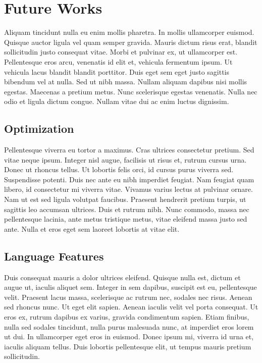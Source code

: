 \chapter{Future Works}
Aliquam tincidunt nulla eu enim mollis pharetra. In mollis ullamcorper euismod. Quisque auctor ligula vel quam semper gravida. Mauris dictum risus erat, blandit sollicitudin justo consequat vitae. Morbi et pulvinar ex, ut ullamcorper est. Pellentesque eros arcu, venenatis id elit et, vehicula fermentum ipsum. Ut vehicula lacus blandit blandit porttitor. Duis eget sem eget justo sagittis bibendum vel at nulla. Sed ut nibh massa. Nullam aliquam dapibus nisi mollis egestas. Maecenas a pretium metus. Nunc scelerisque egestas venenatis. Nulla nec odio et ligula dictum congue. Nullam vitae dui ac enim luctus dignissim.


\section{Optimization}
Pellentesque viverra eu tortor a maximus. Cras ultrices consectetur pretium. Sed vitae neque ipsum. Integer nisl augue, facilisis ut risus et, rutrum cursus urna. Donec ut rhoncus tellus. Ut lobortis felis orci, id cursus purus viverra sed. Suspendisse potenti. Duis nec ante eu nibh imperdiet feugiat. Nam feugiat quam libero, id consectetur mi viverra vitae. Vivamus varius lectus at pulvinar ornare. Nam ut est sed ligula volutpat faucibus. Praesent hendrerit pretium turpis, ut sagittis leo accumsan ultrices. Duis et rutrum nibh. Nunc commodo, massa nec pellentesque lacinia, ante metus tristique metus, vitae eleifend massa justo sed ante. Nulla et eros eget sem laoreet lobortis at vitae elit.


\section{Language Features}
Duis consequat mauris a dolor ultrices eleifend. Quisque nulla est, dictum et augue ut, iaculis aliquet sem. Integer in sem dapibus, suscipit est eu, pellentesque velit. Praesent lacus massa, scelerisque ac rutrum nec, sodales nec risus. Aenean sed rhoncus nunc. Ut eget elit sapien. Aenean iaculis velit vel porta consequat. Ut eros ex, rutrum dapibus ex varius, gravida condimentum sapien. Etiam finibus, nulla sed sodales tincidunt, nulla purus malesuada nunc, at imperdiet eros lorem ut dui. In ullamcorper eget eros in euismod. Donec ipsum mi, viverra id urna et, iaculis aliquam tellus. Duis lobortis pellentesque elit, ut tempus mauris pretium sollicitudin.
